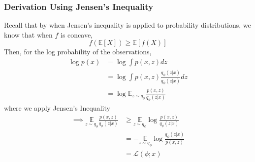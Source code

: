 \documentclass[11pt]{article}
\begin{document}
\subsubsection{Derivation Using Jensen's Inequality}
Recall that by when Jensen's inequality is applied to probability distributions, we know that when $f$ is concave,
\begin{equation}
    f(\mathbb{E}[X]) \geq \mathbb{E}[f(X)]
\end{equation}
Then, for the log probability of the observations,
\begin{align}
    \log p(x) 
    &= \log \int p(x,z) dz \\
    &= \log \int p(x,z) \frac{q_\phi(z|x)}{q_\phi(z|x)} dz \\
    &= \log \mathbb{E}_{z\sim q_\phi} \frac{p(x,z)}{q_\phi(z|x)}
\end{align}
where we apply Jensen's Inequality
\begin{align}
    \implies \underset{z \sim q_{\phi}}{\mathbb{E}} \frac{p(x, z)}{q_{\phi}(z | x)} 
    &\geq \underset{z \sim q_{\phi}}{\mathbb{E}} \log \frac{p(x, z)}{q_{\phi}(z | x)} \\
    &= -\underset{z \sim q_{\phi}}{\mathbb{E}} \log \frac{q_{\phi}(z | x)}{p(x, z)} \\
    &=\mathcal{L}(\phi ; x)
\end{align}
\end{document}
